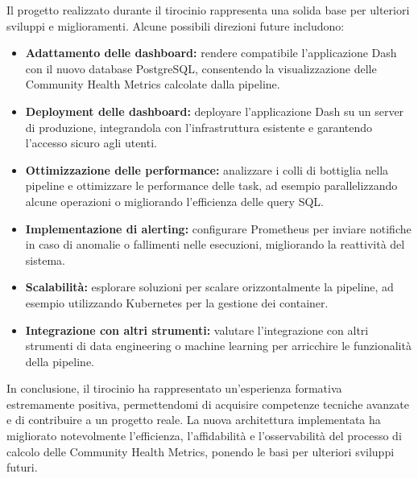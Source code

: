 Il progetto realizzato durante il tirocinio rappresenta una solida base per ulteriori sviluppi e miglioramenti. Alcune possibili direzioni future includono:
\begin{itemize}
    \item \textbf{Adattamento delle dashboard:} rendere compatibile l’applicazione Dash con il nuovo database PostgreSQL, consentendo la visualizzazione delle Community Health Metrics calcolate dalla pipeline.
    \item \textbf{Deployment delle dashboard:} deployare l’applicazione Dash su un server di produzione, integrandola con l'infrastruttura esistente e garantendo l’accesso sicuro agli utenti.
    \item \textbf{Ottimizzazione delle performance:} analizzare i colli di bottiglia nella pipeline e ottimizzare le performance delle task, ad esempio parallelizzando alcune operazioni o migliorando l’efficienza delle query SQL.
    \item \textbf{Implementazione di alerting:} configurare Prometheus per inviare notifiche in caso di anomalie o fallimenti nelle esecuzioni, migliorando la reattività del sistema.
    \item \textbf{Scalabilità:} esplorare soluzioni per scalare orizzontalmente la pipeline, ad esempio utilizzando Kubernetes per la gestione dei container.
    \item \textbf{Integrazione con altri strumenti:} valutare l’integrazione con altri strumenti di data engineering o machine learning per arricchire le funzionalità della pipeline.
\end{itemize}

In conclusione, il tirocinio ha rappresentato un’esperienza formativa estremamente positiva, permettendomi di acquisire competenze tecniche avanzate e di contribuire a un progetto reale. La nuova architettura implementata ha migliorato notevolmente l’efficienza, l’affidabilità e l’osservabilità del processo di calcolo delle Community Health Metrics, ponendo le basi per ulteriori sviluppi futuri.